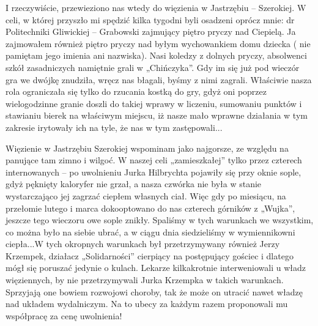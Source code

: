 I rzeczywiście, przewieziono nas wtedy do więzienia w Jastrzębiu – Szerokiej. W celi, w której przyszło mi spędzić kilka tygodni byli osadzeni oprócz mnie: dr Politechniki Gliwickiej – Grabowski zajmujący piętro pryczy nad Ciepielą. Ja zajmowałem również piętro pryczy nad byłym wychowankiem domu dziecka ( nie pamiętam jego imienia ani nazwiska). Nasi koledzy z dolnych pryczy, absolwenci szkół zasadniczych namiętnie grali w „Chińczyka”. Gdy im się już pod wieczór gra we dwójkę znudziła, wręcz nas błagali, byśmy z nimi zagrali. Właściwie nasza rola ograniczała się tylko do rzucania kostką do gry, gdyż oni poprzez wielogodzinne granie doszli do takiej wprawy w liczeniu, sumowaniu punktów i stawianiu bierek na właściwym miejscu, iż nasze mało wprawne działania w tym zakresie irytowały ich na tyle, że nas w tym zastępowali...

Więzienie w Jastrzębiu Szerokiej wspominam jako najgorsze, ze względu na panujące tam zimno i wilgoć. W naszej celi „zamieszkałej” tylko przez czterech internowanych – po uwolnieniu Jurka Hilbrychta pojawiły się przy oknie sople, gdyż pęknięty kaloryfer nie grzał, a nasza czwórka nie była w stanie wystarczająco jej zagrzać ciepłem własnych ciał. Więc gdy po miesiącu, na przełomie lutego i marca dokooptowano do nas czterech górników z „Wujka”, jeszcze tego wieczoru owe sople znikły. Spaliśmy w tych warunkach we wszystkim, co można było na siebie ubrać, a w ciągu dnia siedzieliśmy w wymiennikowni ciepła...W tych okropnych warunkach był przetrzymywany również Jerzy Krzempek, działacz „Solidarności” cierpiący na postępujący gościec i dlatego mógł się poruszać jedynie o kulach. Lekarze kilkakrotnie interweniowali u władz więziennych, by nie przetrzymywali Jurka Krzempka w takich warunkach. Sprzyjają one bowiem rozwojowi choroby, tak że może on utracić nawet władzę nad układem wydalniczym. Na to ubecy za każdym razem proponowali mu współpracę za cenę uwolnienia!


